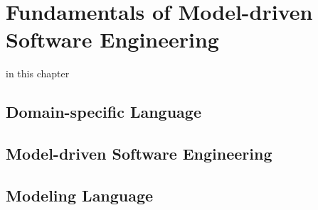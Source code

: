 \chapter{Fundamentals of Model-driven Software Engineering}
\label{ch:fundamentals}

in this chapter

\section{Domain-specific Language}
\section{Model-driven Software Engineering}
\section{Modeling Language}